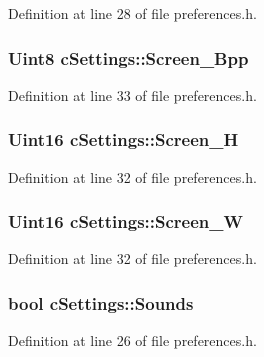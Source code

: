 Definition at line 28 of file preferences.\-h.

\hypertarget{classc_settings_a13fd498f662fb549818da0b1ecd0a040}{
\subsubsection[{Screen\-\_\-\-Bpp}]{\setlength{\rightskip}{0pt plus 5cm}Uint8 c\-Settings\-::\-Screen\-\_\-\-Bpp}}\label{classc_settings_a13fd498f662fb549818da0b1ecd0a040}


Definition at line 33 of file preferences.\-h.

\hypertarget{classc_settings_a0b956ad1e4ee40b78a8deb80fad448b9}{
\subsubsection[{Screen\-\_\-\-H}]{\setlength{\rightskip}{0pt plus 5cm}Uint16 c\-Settings\-::\-Screen\-\_\-\-H}}\label{classc_settings_a0b956ad1e4ee40b78a8deb80fad448b9}


Definition at line 32 of file preferences.\-h.

\hypertarget{classc_settings_a3c3f9e8a8747fbf6cbdfd8ba1c3d76a9}{
\subsubsection[{Screen\-\_\-\-W}]{\setlength{\rightskip}{0pt plus 5cm}Uint16 c\-Settings\-::\-Screen\-\_\-\-W}}\label{classc_settings_a3c3f9e8a8747fbf6cbdfd8ba1c3d76a9}


Definition at line 32 of file preferences.\-h.

\hypertarget{classc_settings_a346a004a29a60f63b4a355209ff1258a}{
\subsubsection[{Sounds}]{\setlength{\rightskip}{0pt plus 5cm}bool c\-Settings\-::\-Sounds}}\label{classc_settings_a346a004a29a60f63b4a355209ff1258a}


Definition at line 26 of file preferences.\-h.

